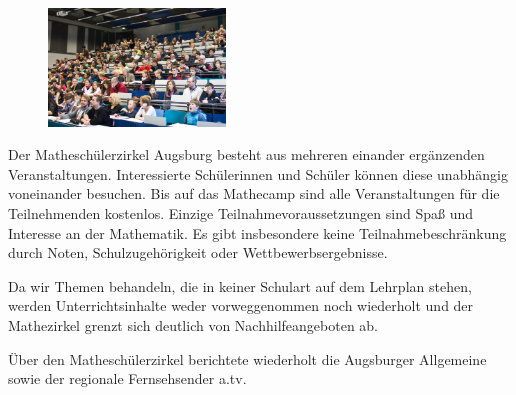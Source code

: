 \documentclass[12pt]{zettel}
\begin{document}

\begin{figure}
  \vspace{-1em}
  \begin{flushright}
     \includegraphics[width=0.42\textwidth]{impressionen/auftakt1.jpg}
  \end{flushright}
  \vspace{-2.2em}
\end{figure}


Der Matheschülerzirkel Augsburg besteht aus mehreren einander ergänzenden Veranstaltungen. Interessierte Schülerinnen und Schüler können diese unabhängig voneinander besuchen. Bis auf das Mathecamp sind alle Veranstaltungen für die Teilnehmenden kostenlos. Einzige Teilnahmevoraussetzungen sind Spaß und Interesse an der Mathematik. Es gibt insbesondere keine Teilnahmebeschränkung durch Noten, Schulzugehörigkeit oder Wettbewerbsergebnisse.
% 


Da wir Themen behandeln, die in keiner Schulart auf dem Lehrplan stehen, werden Unterrichtsinhalte weder vorweggenommen noch wiederholt und der Mathezirkel grenzt sich deutlich von Nachhilfeangeboten ab.

Über den Matheschülerzirkel berichtete wiederholt die Augsburger Allgemeine sowie der regionale Fernsehsender a.tv.
\end{document}
